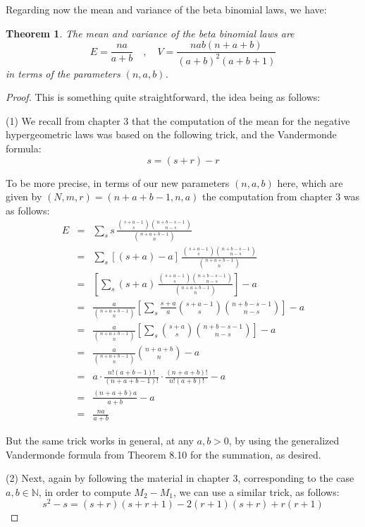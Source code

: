 \documentclass[12pt]{amsbook}
\newtheorem{theorem}{Theorem}[chapter]
\begin{document}
Regarding now the mean and variance of the beta binomial laws, we have:

\begin{theorem}
The mean and variance of the beta binomial laws are
$$E=\frac{na}{a+b}\quad,\quad V=\frac{nab(n+a+b)}{(a+b)^2(a+b+1)}$$
in terms of the parameters $(n,a,b)$.
\end{theorem}

\begin{proof}
This is something quite straightforward, the idea being as follows:

\medskip

(1) We recall from chapter 3 that the computation of the mean for the negative hypergeometric laws was based on the following trick, and the Vandermonde formula:
$$s=(s+r)-r$$

To be more precise, in terms of our new parameters $(n,a,b)$ here, which are given by $(N,m,r)=(n+a+b-1,n,a)$ the computation from chapter 3 was as follows:
\begin{eqnarray*}
E
&=&\sum_ss\,\frac{\binom{s+a-1}{s}\binom{n+b-s-1}{n-s}}{\binom{n+a+b-1}{n}}\\
&=&\sum_s[(s+a)-a]\,\frac{\binom{s+a-1}{s}\binom{n+b-s-1}{n-s}}{\binom{n+a+b-1}{n}}\\
&=&\left[\sum_s(s+a)\,\frac{\binom{s+a-1}{s}\binom{n+b-s-1}{n-s}}{\binom{n+a+b-1}{n}}\right]-a\\
&=&\frac{a}{\binom{n+a+b-1}{n}}\left[\sum_s\frac{s+a}{a}\binom{s+a-1}{s}\binom{n+b-s-1}{n-s}\right]-a\\
&=&\frac{a}{\binom{n+a+b-1}{n}}\left[\sum_s\binom{s+a}{s}\binom{n+b-s-1}{n-s}\right]-a\\
&=&\frac{a}{\binom{n+a+b-1}{n}}\binom{n+a+b}{n}-a\\
&=&a\cdot\frac{n!(a+b-1)!}{(n+a+b-1)!}\cdot\frac{(n+a+b)!}{n!(a+b)!}-a\\
&=&\frac{(n+a+b)a}{a+b}-a\\
&=&\frac{na}{a+b}
\end{eqnarray*}

But the same trick works in general, at any $a,b>0$, by using the generalized Vandermonde formula from Theorem 8.10 for the summation, as desired.

\medskip

(2) Next, again by following the material in chapter 3, corresponding to the case $a,b\in\mathbb N$, in order to compute $M_2-M_1$, we can use a similar trick, as follows:
$$s^2-s=(s+r)(s+r+1)-2(r+1)(s+r)+r(r+1)$$


\end{proof}
\end{document}
